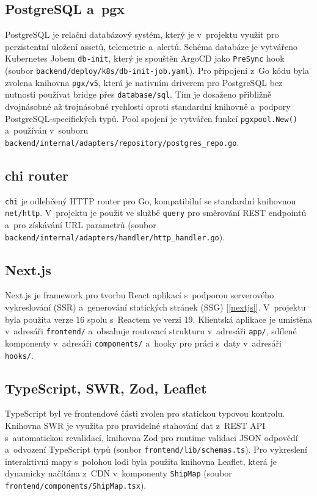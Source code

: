 \documentclass[11pt, a4paper, oneside]{article}
\begin{document}
\subsection{PostgreSQL a~pgx}

PostgreSQL je relační databázový systém, který je v~projektu využit pro perzistentní uložení assetů, telemetrie a~alertů. Schéma databáze je vytvářeno Kubernetes Jobem \texttt{db-init}, který je spouštěn ArgoCD jako \texttt{PreSync} hook (soubor \texttt{backend/deploy/k8s/db-init-job.yaml}). Pro připojení z~Go kódu byla zvolena knihovna \texttt{pgx/v5}, která je nativním driverem pro PostgreSQL bez nutnosti používat bridge přes \texttt{database/sql}. Tím je dosaženo přibližně dvojnásobné až trojnásobné rychlosti oproti standardní knihovně a~podpory PostgreSQL-specifických typů. Pool spojení je vytvářen funkcí \texttt{pgxpool.New()} a~používán v~souboru \texttt{backend/internal/adapters/repository/postgres\_repo.go}.

\subsection{chi router}

\texttt{chi} je odlehčený HTTP router pro Go, kompatibilní se standardní knihovnou \texttt{net/http}. V~projektu je použit ve službě \texttt{query} pro směrování REST endpointů a~pro získávání URL parametrů (soubor \texttt{backend/internal/adapters/handler/http\_handler.go}).

\subsection{Next.js}

Next.js je framework pro tvorbu React aplikací s~podporou serverového vykreslování (SSR) a~generování statických stránek (SSG) [\ref{nextjs}]. V~projektu byla použita verze 16 spolu s~Reactem ve verzi 19. Klientská aplikace je umístěna v~adresáři \texttt{frontend/} a~obsahuje routovací strukturu v~adresáři \texttt{app/}, sdílené komponenty v~adresáři \texttt{components/} a~hooky pro práci s~daty v~adresáři \texttt{hooks/}.

\subsection{TypeScript, SWR, Zod, Leaflet}

TypeScript byl ve frontendové části zvolen pro statickou typovou kontrolu. Knihovna SWR je využita pro pravidelné stahování dat z~REST API s~automatickou revalidací, knihovna Zod pro runtime validaci JSON odpovědí a~odvození TypeScript typů (soubor \texttt{frontend/lib/schemas.ts}). Pro vykreslení interaktivní mapy s~polohou lodi byla použita knihovna Leaflet, která je dynamicky načítána z~CDN v~komponenty \texttt{ShipMap} (soubor \texttt{frontend/components/ShipMap.tsx}).
\end{document}
